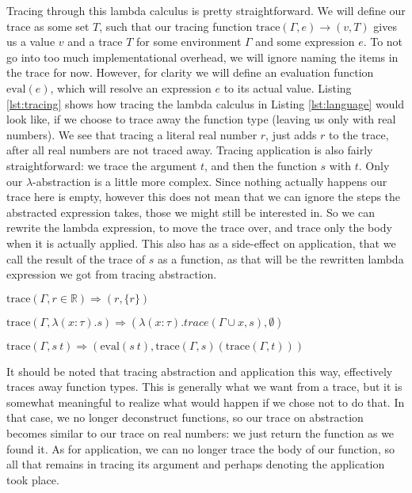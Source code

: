         Tracing through this lambda calculus is pretty straightforward.
        We will define our trace as some set $T$, such that our tracing function $\text{trace}(\Gamma,e)\to(v,T)$ gives us a value $v$ and a trace $T$ for some environment $\Gamma$ and some expression $e$.
        To not go into too much implementational overhead, we will ignore naming the items in the trace for now.
        However, for clarity we will define an evaluation function $\text{eval}(e)$, which will resolve an expression $e$ to its actual value.
        Listing \ref{lst:tracing} shows how tracing the lambda calculus in Listing \ref{lst:language} would look like, if we choose to trace away the function type (leaving us only with real numbers).
        We see that tracing a literal real number $r$, just adds $r$ to the trace, after all real numbers are not traced away.
        Tracing application is also fairly straightforward: we trace the argument $t$, and then the function $s$ with $t$.
        Only our $\lambda$-abstraction is a little more complex.
        Since nothing actually happens our trace here is empty, however this does not mean that we can ignore the steps the abstracted expression takes, those we might still be interested in.
        So we can rewrite the lambda expression, to move the trace over, and trace only the body when it is actually applied.
        This also has as a side-effect on application, that we call the result of the trace of $s$ as a function, as that will be the rewritten lambda expression we got from tracing abstraction.

        \begin{quicklst}[caption=First tracing rules, label=lst:tracing, gobble=12]
            $\text{trace}(\Gamma,r\in\mathbb{R})\Rightarrow(r, \{r\})$

            $\text{trace}(\Gamma,\lambda(x:\tau).s)\Rightarrow(\lambda(x:\tau).trace(\Gamma\cup x, s),\emptyset)$

            $\text{trace}(\Gamma,s\ t)\Rightarrow(\text{eval}(s\ t),\text{trace}(\Gamma, s)(\text{trace}(\Gamma,t)))$
        \end{quicklst}

        It should be noted that tracing abstraction and application this way, effectively traces away function types.
        This is generally what we want from a trace, but it is somewhat meaningful to realize what would happen if we chose not to do that.
        In that case, we no longer deconstruct functions, so our trace on abstraction becomes similar to our trace on real numbers: we just return the function as we found it.
        As for application, we can no longer trace the body of our function, so all that remains in tracing its argument and perhaps denoting the application took place.

